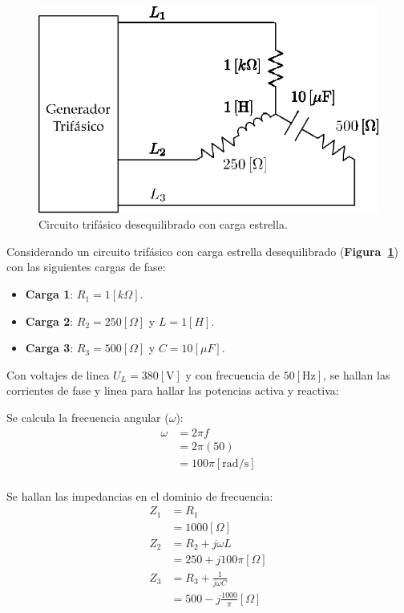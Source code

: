 \documentclass[letter,11pt]{article}
\begin{document}
\begin{figure}[!h]
\centering
\includegraphics[scale=0.95]{figura1.eps}
\caption{Circuito trifásico desequilibrado con carga estrella.}
\label{circuito1}
\end{figure}

Considerando un circuito trifásico con carga estrella desequilibrado
(\textbf{Figura~\ref{circuito1}}) con las siguientes cargas de fase:

\begin{itemize}
    \item \textbf{Carga 1}: $R_1=1[k\Omega]$.
    \item \textbf{Carga 2}: $R_2=250[\Omega]$ y $L=1[H]$.
    \item \textbf{Carga 3}: $R_3=500[\Omega]$ y $C=10[\mu F]$.
\end{itemize}

Con voltajes de linea $U_L=380[\text{V}]$ y con frecuencia de $50[\text{Hz}]$,
se hallan las corrientes de fase y linea para hallar las potencias activa y
reactiva:

Se calcula la frecuencia angular ($\omega$):
\begin{equation*}
    \begin{split}
        \omega&=2\pi f\\
              &=2\pi(50)\\
              &=100\pi[\text{rad}/\text{s}]\\
    \end{split}
\end{equation*}

Se hallan las impedancias en el dominio de frecuencia:
\begin{equation*}
    \begin{split}
        Z_1 &= R_1\\
            &= 1000[\Omega]\\
        Z_2 &= R_2+j\omega L\\
            &= 250+j100\pi[\Omega]\\
        Z_3 &= R_3+\frac{1}{j\omega C}\\
            &= 500-j\frac{1000}{\pi}[\Omega]\\
    \end{split}
\end{equation*}
\end{document}
